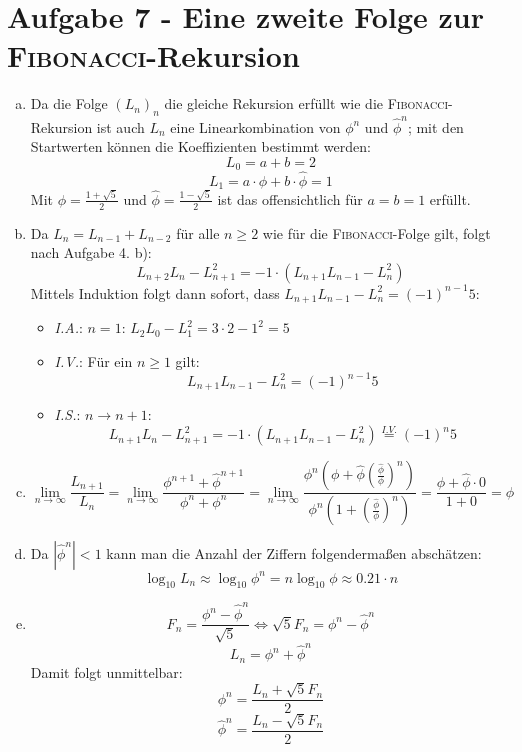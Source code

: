 \section*{Aufgabe 7 - Eine zweite Folge zur \textsc{Fibonacci}-Rekursion}

\begin{enumerate}[(a)]

\item
	Da die Folge $(L_n)_n$ die gleiche Rekursion erfüllt wie die \textsc{Fibonacci}-Rekursion
	ist auch $L_n$ eine Linearkombination von $\phi^n$ und $\hat\phi^n$; mit den Startwerten
	können die Koeffizienten bestimmt werden:
	\[ L_0 = a + b = 2 \]
	\[ L_1 = a \cdot \phi + b\cdot \hat\phi = 1 \]
	Mit $\phi = \frac{1 + \sqrt{5}}{2}$ und $\hat\phi = \frac{1 - \sqrt{5}}{2}$ ist das offensichtlich für $a = b = 1$ erfüllt.

\item 
	Da $L_n = L_{n-1} + L_{n-2}$ für alle $n \geq 2$ wie für die \textsc{Fibonacci}-Folge gilt, folgt nach Aufgabe 4. b):
	\[ L_{n+2}L_n  - L_{n+1}^2 = -1 \cdot (L_{n+1}L_{n-1} - L_n^2) \]
	Mittels Induktion folgt dann sofort, dass $L_{n+1}L_{n-1} - L_n^2 = (-1)^{n-1}5$:
	\begin{itemize}
		\item \textit{I.A.}: $n = 1$: $L_2L_0 - L_1^2 = 3 \cdot 2 - 1^2 = 5$
		\item \textit{I.V.}: Für ein $n \geq 1$ gilt:
			\[ L_{n+1}L_{n-1} - L_n^2 = (-1)^{n-1} 5 \]
		\item \textit{I.S.}: $n \rightarrow n+1$:
			\[ L_{n+1}L_n - L_{n+1}^2 = -1 \cdot (L_{n+1}L_{n-1} - L_n^2) \overset{I.V.}{=} (-1)^n 5 \]
	\end{itemize}

\item
	\[ \lim_{n \rightarrow \infty} \frac{L_{n+1}}{L_n} =
	   \lim_{n \rightarrow \infty} \frac{\phi^{n+1} + \hat\phi^{n+1}}{\phi^n + \phi^n} =
	   \lim_{n \rightarrow \infty} \frac{\phi^n \left(\phi + \hat\phi \left( \frac{\hat\phi}{\phi}\right)^n \right)}
	   				    {\phi^n \left( 1 + \left(\frac{\hat\phi}{\phi}\right)^n \right)} =
	   \frac{\phi + \hat\phi \cdot 0}{1 + 0} = \phi \]

\item Da $|\hat\phi^n| < 1$ kann man die Anzahl der Ziffern folgendermaßen abschätzen:
	\[ \log_ {10} L_n \approx \log_{10} \phi^n = n \log_{10} \phi \approx 0.21 \cdot n \]

\item
	\[ F_n = \frac{\phi^n - \hat\phi^n}{\sqrt{5}} \Leftrightarrow \sqrt{5} F_n = \phi^n - \hat\phi^n \]
	\[ L_n = \phi^n + \hat\phi^n \]
	Damit folgt unmittelbar:
	\[ \phi^n = \frac{L_n + \sqrt{5} F_n}{2} \]
	\[ \hat\phi^n = \frac{L_n - \sqrt{5} F_n}{2} \]
\end{enumerate}
